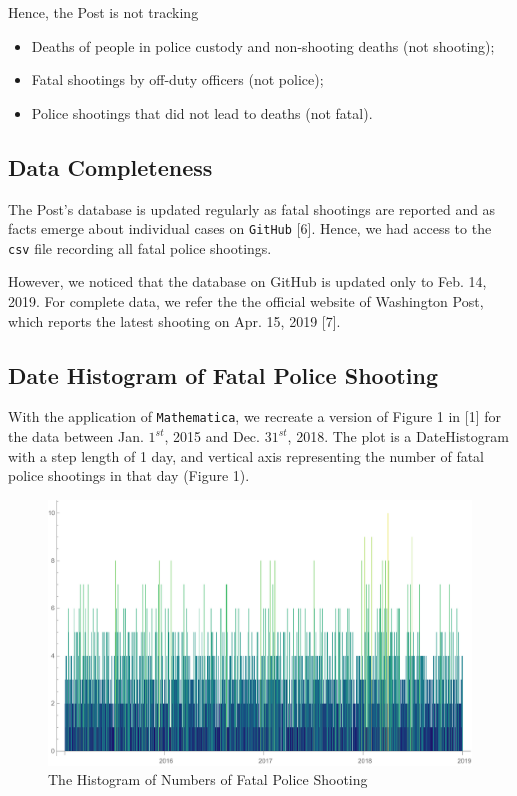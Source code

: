 \documentclass[a4paper]{article}
\begin{document}
Hence, the Post is not tracking 
\begin{itemize}
\item Deaths of people in police custody and non-shooting deaths (not shooting);
\item Fatal shootings by off-duty officers (not police);
\item Police shootings that did not lead to deaths (not fatal).
\end{itemize}

\subsection{Data Completeness}
The Post's database is updated regularly as fatal shootings are reported and as facts emerge about individual cases on \texttt{GitHub} [6]. Hence, we had access to the \texttt{csv} file recording all fatal police shootings.

However, we noticed that the database on GitHub is updated only to Feb. 14, 2019. For complete data, we refer the the official website of Washington Post, which reports the latest shooting on Apr. 15, 2019 [7].
\subsection{Date Histogram of Fatal Police Shooting}
With the application of \texttt{Mathematica}, we recreate a version of Figure 1 in [1] for the data between Jan. $1^{st}$, 2015 and Dec. $31^{st}$, 2018. The plot is a DateHistogram with a step length of 1 day, and vertical axis representing the number of fatal police shootings in that day (Figure 1).

\begin{figure}[!htbp]
\centering
\includegraphics[width=1\linewidth]{ex2.pdf}
\caption{The Histogram of Numbers of Fatal Police Shooting}
\end{figure}
\end{document}
